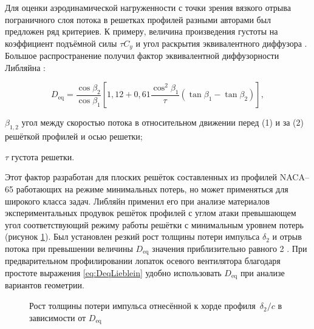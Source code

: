 Для оценки аэродинамической нагруженности с точки зрения вязкого отрыва пограничного слоя потока в решетках профилей разными авторами был предложен ряд критериев. К примеру, величина произведения густоты на коэффициент подъёмной силы $\tau C_y$ \cite{Hausenblas1963,Dovjik1968} и угол раскрытия эквивалентного диффузора \cite{Dovjik1958,Uschakov1963}. Большое распространение получил фактор эквивалентной диффузорности Либляйна \cite{Lieblein1959}:

\begin{equation}
	D_\text{eq} = \frac{\cos \beta_2}{\cos \beta_1} \left[ 1,12 + 0,61\frac{\cos^2\beta_1}{\tau}(\tan \beta_1 - \tan\beta_2) \right],
	\label{eq:DeqLieblein}
\end{equation}

\begin{eqexpl}
	\item{$\beta_{1,2}$} угол между скоростью потока в относительном движении перед (1) и за (2) решёткой профилей и осью решетки;
	\item{$\tau$} густота решетки.
\end{eqexpl}

Этот фактор разработан для плоских решёток составленных из профилей NACA–65 работающих на режиме минимальных потерь, но может применяться для широкого класса задач. Либляйн применил его при анализе материалов экспериментальных продувок решёток профилей с углом атаки превышающем угол соответствующий режиму работы решётки с минимальным уровнем потерь (рисунок \ref{fig:DeqLieblein}). Был установлен резкий рост толщины потери импульса $\delta_2$ и отрыв потока при превышении величины $D_\text{eq}$ значения приблизительно равного 2 \cite{Lieblein1959}. При предварительном профилировании лопаток осевого вентилятора благодаря простоте выражения \ref{eq:DeqLieblein} удобно использовать $D_\text{eq}$ при анализе вариантов геометрии.

\begin{figure}
	
	\caption{Рост толщины потери импульса отнесённой к хорде профиля~$\delta_2/c$ в зависимости от $D_\text{eq}$ \cite{Lieblein1959}}
	\label{fig:DeqLieblein}
\end{figure}

